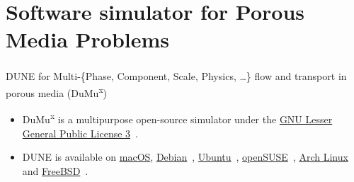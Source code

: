 \section{Software simulator for Porous Media Problems}

\begin{frame}
	\frametitle{\secname}

	\begin{alertblock}{DUNE for Multi-\{Phase, Component, Scale, Physics, \ldots\} flow and transport in porous media (DuMu\textsuperscript{x})}
		\begin{itemize}\small
			\item

			      DuMu\textsuperscript{x} is a multipurpose open-source simulator under the
			      \href{https://www.gnu.org/licenses/lgpl-3.0.html}{
				      GNU Lesser General Public License 3}~\lgpllicense{}.

			\item

			      DUNE is available on
			      \href{https://github.com/dune-copasi/homebrew-tap}{macOS},
			      \href{https://packages.debian.org/search?suite=sid&section=all&arch=any&searchon=sourcenames&keywords=dune-}{Debian}~\debian{},
			      \href{https://launchpad.net/~opm/+archive/ubuntu/ppa}{Ubuntu}~\ubuntu{},
			      \href{https://build.opensuse.org/search?search_text=dune-&search_for=2&name=1&attrib_type_id=}{openSUSE}~\opensuse{},
			      \href{https://aur.archlinux.org/packages/?O=0&SeB=n&K=dune-&outdated=&SB=n&SO=a&PP=50&do_Search=Ir}{Arch Linux}~\archlinux{}
			      and \href{https://www.freshports.org/search.php?stype=name&method=match&query=dune-&num=20&orderby=category&orderbyupdown=asc&search=Search&format=html&branch=head}{FreeBSD}~\freebsd{}.


\end{itemize}
\end{alertblock}
\end{frame}

